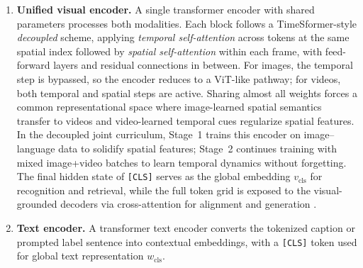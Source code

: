\begin{enrichment}
\begin{enrichment}
\begin{enumerate}
            \item \textbf{Unified visual encoder.} A single transformer encoder with shared parameters processes both modalities. Each block follows a TimeSformer-style \emph{decoupled} scheme, applying \emph{temporal self-attention} across tokens at the same spatial index followed by \emph{spatial self-attention} within each frame, with feed-forward layers and residual connections in between. For images, the temporal step is bypassed, so the encoder reduces to a ViT-like pathway; for videos, both temporal and spatial steps are active. Sharing almost all weights forces a common representational space where image-learned spatial semantics transfer to videos and video-learned temporal cues regularize spatial features. In the decoupled joint curriculum, Stage~1 trains this encoder on image–language data to solidify spatial features; Stage~2 continues training with mixed image+video batches to learn temporal dynamics without forgetting. The final hidden state of \texttt{[CLS]} serves as the global embedding \(v_{\mathrm{cls}}\) for recognition and retrieval, while the full token grid is exposed to the visual-grounded decoders via cross-attention for alignment and generation \cite{wang2022_omnivl}. 
            
            \item \textbf{Text encoder.} A transformer text encoder converts the tokenized caption or prompted label sentence into contextual embeddings, with a \texttt{[CLS]} token used for global text representation \(w_{\mathrm{cls}}\). 
            

\end{enumerate}
\end{enrichment}
\end{enrichment}
